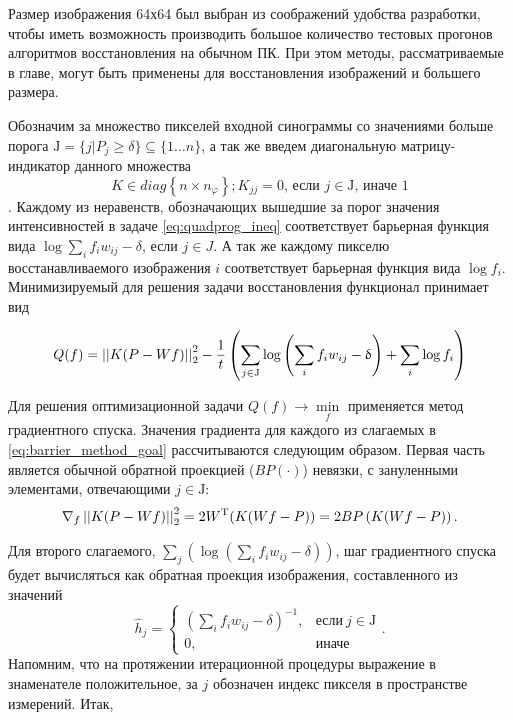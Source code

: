 Размер изображения 64х64 был выбран из соображений удобства разработки, чтобы иметь возможность производить большое количество тестовых прогонов алгоритмов восстановления на обычном ПК.
При этом методы, рассматриваемые в главе, могут быть применены для восстановления изображений и большего размера.


Обозначим за множество пикселей входной синограммы со значениями больше порога $\mathrm J = \{j | P_j \geq \delta \} \subseteq \{1 \dots n\}$, а так же введем диагональную матрицу-индикатор данного множества 
$$
K \in diag\left\{n \times n_\varphi\right\}; K_{jj} = 0 \text{, если\ } j \in \mathrm J \text{, иначе\ } 1
$$.
Каждому из неравенств, обозначающих вышедшие за порог значения интенсивностей в задаче \eqref{eq:quadprog_ineq} соответствует барьерная функция вида $\log{\sum_i f_{i} w_{ij} - \delta}$, если $j \in J$. 
А так же каждому пикселю восстанавливаемого изображения $i$ соответствует барьерная функция вида $\log{f_i}$.
Минимизируемый для решения задачи восстановления функционал принимает вид

\begin{equation}
\label{eq:barrier_method_goal}
  Q(f) = \left|\left| K(P - Wf) \right|\right|_2^2 - 
  \frac 1 t \left( 
    \sum_{j \in \mathrm J}{
      \log{\left(\sum_i {f_i w_{ij} - \updelta} \right)}
    }
    +
    \sum_{i}{
      \log{f_i}
    }
  \right)
\end{equation}

Для решения оптимизационной задачи $Q(f) \rightarrow \min\limits_f$ применяется метод градиентного спуска.
Значения градиента для каждого из слагаемых в \eqref{eq:barrier_method_goal} рассчитываются следующим образом. 
Первая часть является обычной обратной проекцией ($BP(\cdot)$) невязки, с зануленными элементами, отвечающими $j \in \mathrm J$:
$$
\nabla_f \left|\left| K(P - Wf) \right|\right|_2^2 = 2 W ^ {\mathrm T} (K(Wf - P)) = 
  2 BP\left(K(Wf-P)\right).
$$

Для второго слагаемого, $\sum_j {\left(\log{\left(\sum_i {f_i w_{ij} - \delta} \right)}\right)}$, шаг градиентного спуска будет вычисляться как обратная проекция изображения, составленного из значений 
$$
\hat{h}_j = 
  \begin{cases}
    \left(\sum_i {f_i w_{ij}} - \delta \right)^{-1}, & \text{если}\ j \in \mathrm J \\
    0, & \text{иначе}
  \end{cases}.
$$
Напомним, что на протяжении итерационной процедуры выражение в знаменателе положительное, за $j$ обозначен индекс пикселя в пространстве измерений.
Итак,


